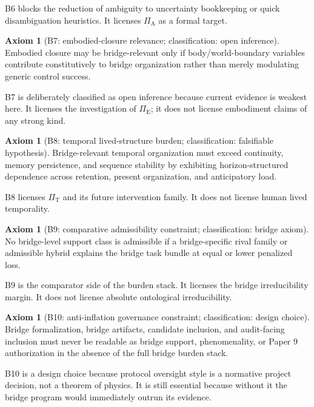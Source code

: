 \documentclass[11pt,a4paper]{article}
\theoremstyle{definition}
\newtheorem{axiom}[theorem]{Axiom}
\newcommand{\PiA}{\Pi_{\mathrm{A}}}
\newcommand{\PiE}{\Pi_{\mathrm{E}}}
\newcommand{\PiT}{\Pi_{\mathrm{T}}}
\begin{document}
B6 blocks the reduction of ambiguity to uncertainty bookkeeping or quick disambiguation heuristics. It licenses $\PiA$ as a formal target. 

\begin{axiom}[B7: embodied-closure relevance; classification: open inference]
Embodied closure may be bridge-relevant only if body/world-boundary variables contribute constitutively to bridge organization rather than merely modulating generic control success.
\end{axiom}

B7 is deliberately classified as open inference because current evidence is weakest here. It licenses the investigation of $\PiE$; it does not license embodiment claims of any strong kind.

\begin{axiom}[B8: temporal lived-structure burden; classification: falsifiable hypothesis]
Bridge-relevant temporal organization must exceed continuity, memory persistence, and sequence stability by exhibiting horizon-structured dependence across retention, present organization, and anticipatory load.
\end{axiom}

B8 licenses $\PiT$ and its future intervention family. It does not license human lived temporality.

\begin{axiom}[B9: comparative admissibility constraint; classification: bridge axiom]
No bridge-level support class is admissible if a bridge-specific rival family or admissible hybrid explains the bridge task bundle at equal or lower penalized loss.
\end{axiom}

B9 is the comparator side of the burden stack. It licenses the bridge irreducibility margin. It does not license absolute ontological irreducibility.

\begin{axiom}[B10: anti-inflation governance constraint; classification: design choice]
Bridge formalization, bridge artifacts, candidate inclusion, and audit-facing inclusion must never be readable as bridge support, phenomenality, or Paper 9 authorization in the absence of the full bridge burden stack.
\end{axiom}

B10 is a design choice because protocol oversight style is a normative project decision, not a theorem of physics. It is still essential because without it the bridge program would immediately outrun its evidence.
\end{document}
